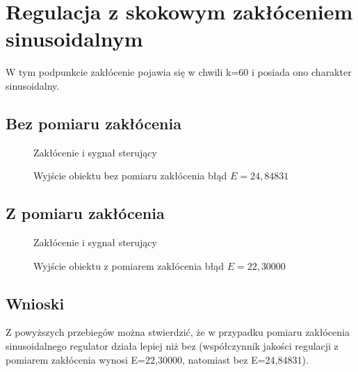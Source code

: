 \chapter{Regulacja z skokowym zakłóceniem sinusoidalnym}

W tym podpunkcie zakłócenie pojawia się w chwili k=60 i posiada ono charakter sinusoidalny.

\section{Bez pomiaru zakłócenia}

\begin{figure}[H]
\centering

\caption{Zakłócenie i sygnał sterujący}
\end{figure}

\begin{figure}[H]
\centering

\caption{Wyjście obiektu bez pomiaru zakłócenia błąd $E=24,84831$}
\end{figure}

\section{Z pomiaru zakłócenia}

\begin{figure}[H]
\centering

\caption{Zakłócenie i sygnał sterujący}
\end{figure}

\begin{figure}[H]
\centering

\caption{Wyjście obiektu z pomiarem zakłócenia błąd $E=22,30000$}
\end{figure}

\section{Wnioski}
Z powyższych przebiegów można stwierdzić, że w przypadku pomiaru zakłócenia sinusoidalnego regulator działa lepiej niż bez (współczynnik jakości regulacji z pomiarem zakłócenia wynosi E=22,30000, natomiast bez E=24,84831).

\smallskip

